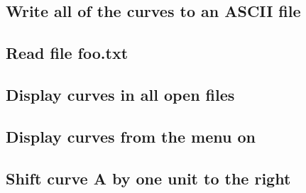 \documentclass[letterpaper,10pt,english]{sphinxmanual}
\begin{document}
\subsection{Write all of the curves to an ASCII file}
\label{\detokenize{getting_started:write-all-of-the-curves-to-an-ascii-file}}
\begin{sphinxVerbatim}[commandchars=\\\{\}]
\PYG{p}{[}\PYG{p}{]}   
\end{sphinxVerbatim}


\subsection{Read file foo.txt}
\label{\detokenize{getting_started:read-file-foo-txt}}
\begin{sphinxVerbatim}[commandchars=\\\{\}]
\PYG{p}{[}\PYG{p}{]}  
\end{sphinxVerbatim}


\subsection{Display curves in all open files}
\label{\detokenize{getting_started:display-curves-in-all-open-files}}
\begin{sphinxVerbatim}[commandchars=\\\{\}]
\PYG{p}{[}\PYG{p}{]} 
\end{sphinxVerbatim}


\subsection{Display curves from the menu on}
\label{\detokenize{getting_started:display-curves-from-the-menu-on}}
\begin{sphinxVerbatim}[commandchars=\\\{\}]
\PYG{p}{[}\PYG{p}{]}   
\end{sphinxVerbatim}


\subsection{Shift curve A by one unit to the right}
\label{\detokenize{getting_started:shift-curve-a-by-one-unit-to-the-right}}
\begin{sphinxVerbatim}[commandchars=\\\{\}]
\PYG{p}{[}\PYG{p}{]}   
\end{sphinxVerbatim}
\end{document}
